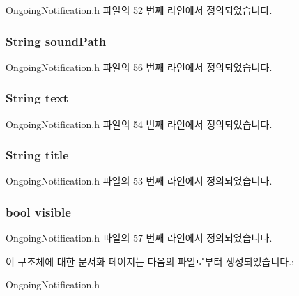 Ongoing\-Notification.\-h 파일의 52 번째 라인에서 정의되었습니다.

\hypertarget{struct___ongoing_notification_extend_ac2d6721b778cd06197fc40a5595c54e1}{
\subsubsection[{sound\-Path}]{\setlength{\rightskip}{0pt plus 5cm}String sound\-Path}}\label{struct___ongoing_notification_extend_ac2d6721b778cd06197fc40a5595c54e1}


Ongoing\-Notification.\-h 파일의 56 번째 라인에서 정의되었습니다.

\hypertarget{struct___ongoing_notification_extend_a685ed5195435d2b3e75433f46aec6e1e}{
\subsubsection[{text}]{\setlength{\rightskip}{0pt plus 5cm}String text}}\label{struct___ongoing_notification_extend_a685ed5195435d2b3e75433f46aec6e1e}


Ongoing\-Notification.\-h 파일의 54 번째 라인에서 정의되었습니다.

\hypertarget{struct___ongoing_notification_extend_a499aeec850a240ae1aecd939c5043590}{
\subsubsection[{title}]{\setlength{\rightskip}{0pt plus 5cm}String title}}\label{struct___ongoing_notification_extend_a499aeec850a240ae1aecd939c5043590}


Ongoing\-Notification.\-h 파일의 53 번째 라인에서 정의되었습니다.

\hypertarget{struct___ongoing_notification_extend_aa54a57ae048476d840caf6d4d2c47aa3}{
\subsubsection[{visible}]{\setlength{\rightskip}{0pt plus 5cm}bool visible}}\label{struct___ongoing_notification_extend_aa54a57ae048476d840caf6d4d2c47aa3}


Ongoing\-Notification.\-h 파일의 57 번째 라인에서 정의되었습니다.



이 구조체에 대한 문서화 페이지는 다음의 파일로부터 생성되었습니다.\-:\begin{DoxyCompactItemize}
\item 
Ongoing\-Notification.\-h\end{DoxyCompactItemize}
